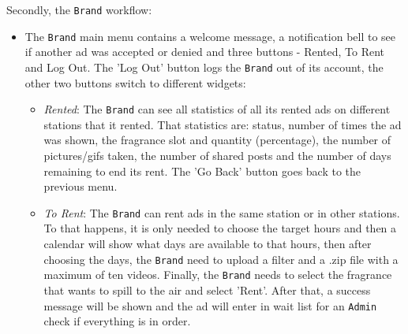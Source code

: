 Secondly, the \texttt{Brand} workflow:
\begin{itemize}
\item The \texttt{Brand} main menu contains a welcome message, a notification bell to see if another ad was accepted or denied and three buttons - Rented, To Rent and Log Out.
The 'Log Out' button logs the \texttt{Brand} out of its account, the other two buttons switch to different widgets:
%
\begin{itemize}
\item \emph{Rented}: The \texttt{Brand} can see all statistics of all its rented ads on different stations that it rented.
That statistics are: status, number of times the ad was shown, the fragrance slot and quantity (percentage), the number of pictures/\gls{gif}s taken, the number of shared posts and the number of days remaining to end its rent.
The 'Go Back' button goes back to the previous menu.
\item \emph{To Rent}: The \texttt{Brand} can rent ads in the same station or in other stations.
To that happens, it is only needed to choose the target hours and then a calendar will show what days are available to that hours, then after choosing the days, the \texttt{Brand} need to upload a filter and a .zip file with a maximum of ten videos. 
Finally, the \texttt{Brand} needs to select the fragrance that wants to spill to the air and select 'Rent'. After that, a success message will be shown and the ad will enter in wait list for an \texttt{Admin} check if everything is in order.
\end{itemize}
%
\end{itemize}

